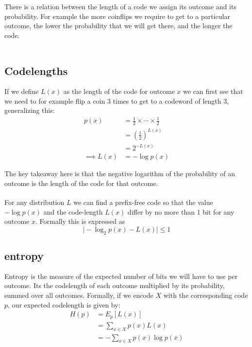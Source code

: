 \documentclass[12pt]{article}
\begin{document}
There is a relation between the length of a code we assign its outcome and its probability. For example the more coinflips we require to get to a particular outcome, the lower the probability that we will get there, and the longer the code.\\  \\ 
\subsection{Codelengths}

If we define $L(x)$ as the length of the code for outcome $x$ we can first see that we need to for example flip a coin 3 times to get to a codeword of length 3, generalizing this: 
\begin{align*}
    p(x) & = \frac{1}{2}\times\cdots\times\frac{1}{2} \\ 
    & = \left(\frac{1}{2}\right)^{L(x)} \\
    & = 2^{-L(x)} \\ 
    \implies L(x)  & = -\log p(x)
\end{align*}

The key takeaway here is that the negative logarithm of the probability of an outcome is the length of the code for that outcome. \\ \\ 
For any distribution $L$ we can find a prefix-free code so that the value $-\log p(x)$ and the code-length $L(x)$ differ by no more than 1 bit for any outcome $x$. Formally this is expressed as 
\[
    \mid -\log_2 p(x) - L(x) \mid \leq 1  
\]
\subsection{entropy}

\begin{definition}[Entropy]
    Entropy is the measure of the expected number of bits we will have to use per outcome. Its the codelength of each outcome multiplied by its probability, summed over all outcomes. Formally, if we encode $X$ with the corresponding code $p$, our expected codelength is given by: 
    \begin{align*}
        H(p) & = E_p [L(x)] \\
        & = \sum_{x\in X} p(x)L(x) \\
        & = -\sum_{x\in X} p(x)\log p(x) \\
    \end{align*}
\end{definition}
\end{document}
